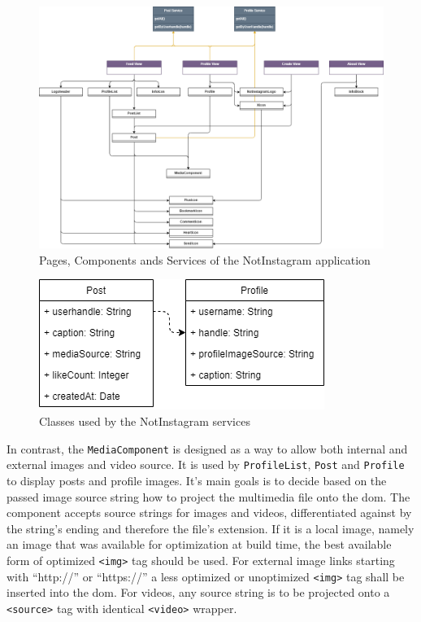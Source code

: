 \documentclass[a4paper, fontsize=11pt]{article}
\begin{document}
\begin{figure}
  \includegraphics[width=\linewidth]{diagrams/uml.png}
  \caption{Pages, Components ands Services of the NotInstagram application}\label{fig:uml}
\end{figure}
\begin{figure}
  \begin{center}
    \includegraphics[width=0.5\linewidth]{diagrams/entities.png}
  \end{center}
  \caption{Classes used by the NotInstagram services}\label{fig:classes}
\end{figure}

In contrast, the \verb|MediaComponent| is designed as a way to allow both internal and external images and video source.
It is used by \verb|ProfileList|, \verb|Post| and \verb|Profile| to display posts and profile images.
It's main goals is to decide based on the passed image source string how to project the multimedia file onto the \acrshort{dom}.
The component accepts source strings for images and videos, differentiated against by the string's ending and therefore the file's extension.
If it is a local image, namely an image that was available for optimization at build time, the best available form of optimized \verb|<img>| tag should be used.
For external image links starting with \enquote{http://} or \enquote{https://} a less optimized or unoptimized \verb|<img>| tag shall be inserted into the \acrshort{dom}.
For videos, any source string is to be projected onto a \verb|<source>| tag with identical \verb|<video>| wrapper.
\end{document}
